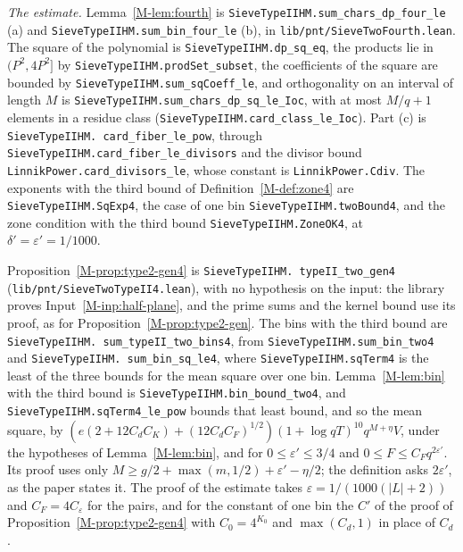 \documentclass[11pt]{article}
\newcommand{\lean}[1]{\texttt{#1}}
\newcommand{\file}[1]{\nolinkurl{#1}}
\numberwithin{equation}{section}
\begin{document}
\emph{The estimate.} Lemma~\ref{M-lem:fourth} is \lean{SieveTypeIIHM.\allowbreak sum\_chars\_dp\_four\_le} (a) and
\lean{SieveTypeIIHM.\allowbreak sum\_bin\_four\_le} (b), in \file{lib/pnt/SieveTwoFourth.lean}. The square of the
polynomial is \lean{SieveTypeIIHM.\allowbreak dp\_sq\_eq}, the products lie in $(P^2, 4P^2]$ by
\lean{SieveTypeIIHM.\allowbreak prodSet\_subset}, the coefficients of the square are bounded by
\lean{SieveTypeIIHM.\allowbreak sum\_sqCoeff\_le}, and orthogonality on an interval of length $M$ is
\lean{SieveTypeIIHM.\allowbreak sum\_chars\_dp\_sq\_le\_Ioc}, with at most $M/q + 1$ elements in a residue class
(\lean{SieveTypeIIHM.\allowbreak card\_class\_le\_Ioc}). Part (c) is \lean{SieveTypeIIHM.\allowbreak
card\_fiber\_le\_pow}, through \lean{SieveTypeIIHM.\allowbreak card\_fiber\_le\_divisors} and the divisor bound
\lean{LinnikPower.\allowbreak card\_divisors\_le}, whose constant is \lean{LinnikPower.\allowbreak Cdiv}. The
exponents with the third bound of Definition~\ref{M-def:zone4} are \lean{SieveTypeIIHM.\allowbreak SqExp4}, the case
of one bin \lean{SieveTypeIIHM.\allowbreak twoBound4}, and the zone condition with the third bound
\lean{SieveTypeIIHM.\allowbreak ZoneOK4}, at $\delta' = \varepsilon' = 1/1000$.

Proposition~\ref{M-prop:type2-gen4} is \lean{SieveTypeIIHM.\allowbreak
typeII\_two\_gen4} (\file{lib/pnt/SieveTwoTypeII4.lean}), with no hypothesis on the input: the library proves
Input~\ref{M-inp:half-plane}, and the prime sums and the kernel bound use its proof, as for
Proposition~\ref{M-prop:type2-gen}. The bins with the third bound are \lean{SieveTypeIIHM.\allowbreak
sum\_typeII\_two\_bins4}, from \lean{SieveTypeIIHM.\allowbreak sum\_bin\_two4} and \lean{SieveTypeIIHM.\allowbreak
sum\_bin\_sq\_le4}, where \lean{SieveTypeIIHM.\allowbreak sqTerm4} is the least of the three bounds for the mean square
over one bin. Lemma~\ref{M-lem:bin} with the third bound is \lean{SieveTypeIIHM.\allowbreak bin\_bound\_two4}, and
\lean{SieveTypeIIHM.\allowbreak sqTerm4\_le\_pow} bounds that least bound, and so the mean square, by $(e(2 +
12C_dC_K) + (12C_dC_F)^{1/2})(1 + \log qT)^{10} q^{M + \eta} V$, under the hypotheses of
Lemma~\ref{M-lem:bin}, and for $0 \le
\varepsilon' \le 3/4$ and $0 \le F \le C_F q^{2\varepsilon'}$. Its proof uses only $M \ge g/2 + \max(m, 1/2) +
\varepsilon' - \eta/2$; the definition asks $2\varepsilon'$, as the paper states it. The proof of the estimate takes
$\varepsilon = 1/(1000(|L| + 2))$ and $C_F = 4C_\varepsilon$ for the pairs, and for the constant of one bin the $C'$ of
the proof of Proposition~\ref{M-prop:type2-gen4} with $C_0 = 4^{K_0}$ and $\max(C_d, 1)$ in place of $C_d$.
\end{document}
